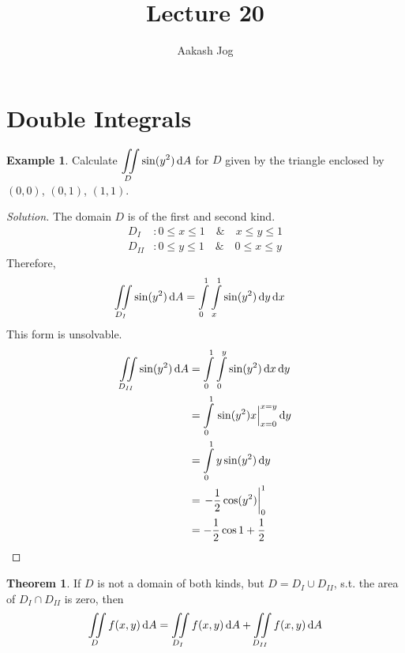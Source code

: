 \documentclass[fleqn, a4paper, 12pt]{article}
\title{Lecture 20}
\author{Aakash Jog}
\date{\formatdate{6}{1}{2015}}
\theoremstyle{definition}
\newtheorem{example}{Example}
\theoremstyle{theorem}
\newtheorem{theorem}{Theorem}
\theoremstyle{remark}
\newenvironment{solution}
{\begin{proof}[Solution]\let\qed\relax}
	{\end{proof}}
\begin{document}
	
\maketitle

\tableofcontents

\newpage

\section{Double Integrals}

\begin{example}
	Calculate $\displaystyle \iint\limits_{D} \sin (y^2) \dif A$ for $D$ given by the triangle enclosed by $(0,0)$, $(0,1)$, $(1,1)$.
\end{example}

\begin{solution}
	The domain $D$ is of the first and second kind.\\
	\begin{align*}
		D_{I} &: 0 \leq x \leq 1 \quad\&\quad x \leq y \leq 1\\
		D_{II} &: 0 \leq y \leq 1 \quad\&\quad 0 \leq x \leq y
	\end{align*}
	Therefore,
	\begin{align*}
		\iint\limits_{D_{I}} \sin (y^2) \dif A &= \int\limits_{0}^{1} \int\limits_{x}^{1} \sin (y^2) \dif y \dif x
	\end{align*}
	This form is unsolvable.
	\begin{align*}
		\iint\limits_{D_{II}} \sin (y^2) \dif A &= \int\limits_{0}^{1} \int\limits_{0}^{y} \sin (y^2) \dif x \dif y\\
		&= \int\limits_{0}^{1} \left. \sin (y^2) x \right\rvert_{x = 0}^{x = y} \dif y\\
		&= \int\limits_{0}^{1} y \sin (y^2) \dif y\\
		&= \left. -\dfrac{1}{2} \cos (y^2) \right\rvert_{0}^{1}\\
		&= -\dfrac{1}{2} \cos 1 + \dfrac{1}{2}
	\end{align*}
\end{solution}

\begin{theorem}
	If $D$ is not a domain of both kinds, but $D = D_{I} \cup D_{II}$, s.t. the area of $D_{I} \cap D_{II}$ is zero, then
	\begin{equation*}
		\iint\limits_{D} f(x,y) \dif A = \iint\limits_{D_{I}} f(x,y) \dif A + \iint\limits_{D_{II}} f(x,y) \dif A
	\end{equation*}
\end{theorem}
\end{document}
